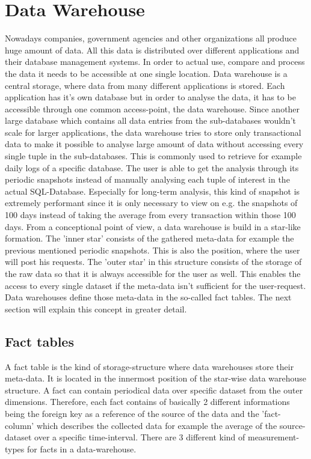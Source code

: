 \documentclass[12pt,a4paper,oneside, 
liststotoc, 					%
bibtotoc,						%
titlepage, 						%
headsepline, 					%
BCOR6mm,						%
openany,							%
]{scrreprt}
\begin{document}
\section{Data Warehouse}\label{dw}
Nowadays companies, government agencies and other organizations all produce huge amount of data. All this data is distributed over different applications and their database management systems. In order to actual use, compare and process the data it needs to be accessible at one single location. %
Data warehouse is a central storage, where data from many different applications is stored. Each application has it's own database but in order to analyse the data, it has to be accessible through one common access-point, the data warehouse. Since another large database which contains all data entries from the sub-databases wouldn't scale for larger applications, the data warehouse tries to store only transactional data to make it possible to analyse large amount of data without accessing every single tuple in the sub-databases. This is commonly used to retrieve for example daily logs of a specific database. The user is able to get the analysis through its periodic snapshots instead of manually analysing each tuple of interest in the actual SQL-Database. Especially for long-term analysis, this kind of snapshot is extremely performant since it is only necessary to view on e.g. the snapshots of 100 days instead of taking the average from every transaction within those 100 days.
From a conceptional point of view, a data warehouse is build in a star-like formation. The 'inner star' consists of the gathered meta-data for example the previous mentioned periodic snapshots. This is also the position, where the user will post his requests. The 'outer star' in this structure consists of the storage of the raw data so that it is always accessible for the user as well. This enables the access to every single dataset if the meta-data isn't sufficient for the user-request.
Data warehouses define those meta-data in the so-called fact tables. The next section will explain this concept in greater detail.
\subsection{Fact tables}\label{factTables}
A fact table is the kind of storage-structure where data warehouses store their meta-data. It is located in the innermost position of the star-wise data warehouse structure. A fact can contain periodical data over specific dataset from the outer dimensions. Therefore, each fact contains of basically 2 different informations being the foreign key as a reference of the source of the data and the 'fact-column' which describes the collected data for example the average of the source-dataset over a specific time-interval. There are 3 different kind of measurement-types for facts in a data-warehouse.
\end{document}
